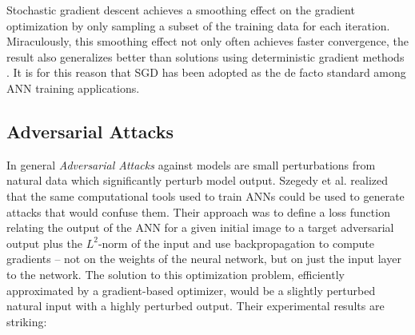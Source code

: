 Stochastic gradient descent achieves a smoothing effect on the gradient optimization by only sampling a subset of the training data for each iteration. Miraculously, this smoothing effect not only often achieves faster convergence, the result also generalizes better than solutions using deterministic gradient methods 
\cite{HardtRS15}. It is for this reason that SGD has been adopted as the de facto standard among ANN training applications.

\subsection{Adversarial Attacks }

In general \emph{Adversarial Attacks} against models
are small perturbations from natural data which significantly perturb
model output. 
Szegedy et al. \cite{Szegedy2013} realized that the same computational tools
used to train ANNs could be used to generate attacks that would
confuse them. Their approach was to define a loss function
relating the output of the ANN for a given initial image to a target adversarial 
output plus the $L^2$-norm of the input and use backpropagation to
compute gradients -- not on the weights of the neural network, but on
just the input layer to the network. The solution to this optimization
problem, efficiently approximated by a gradient-based optimizer, would
be a slightly perturbed natural input with a highly perturbed
output. Their experimental results are striking:\\

